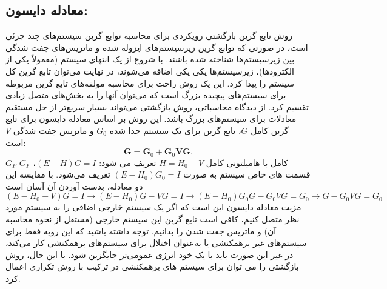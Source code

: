 \subsection{معادله دایسون:}

روش تابع گرین بازگشتی رویکردی برای محاسبه توابع گرین سیستم‌های چند جزئی است، در صورتی که توابع گرین زیرسیستم‌های ایزوله شده و ماتریس‌های جفت شدگی بین زیرسیستم‌ها شناخته شده باشند. با شروع از یک انتهای سیستم (معمولاً یکی از الکترودها)، زیرسیستم‌ها یکی یکی اضافه می‌شوند، در نهایت می‌توان تابع گرین کل سیستم را پیدا کرد. این یک روش راحت برای محاسبه مولفه‌های تابع گرین مربوطه برای سیستم‌های پیچیده بزرگ است که می‌توان آنها را به بخش‌های متصل زیادی تقسیم کرد. از دیدگاه محاسباتی، روش بازگشتی می‌تواند بسیار سریع‌تر از حل مستقیم معادلات برای سیستم‌های بزرگ باشد.
این روش بر اساس معادله دایسون برای تابع گرین کامل $G$، تابع گرین برای یک سیستم جدا شده $G_0$ و ماتریس جفت شدگی $V$ است:
\begin{equation}
    \mathbf{G}={{\mathbf{G}}_{0}}+{{\mathbf{G}}_{0}}\mathbf{VG}.
\end{equation}
$G_F$ کامل با هامیلتونی کامل $H = H_0 + V$ تعریف می شود: $(E - H) G = I$، $G_F$ قسمت های خاص سیستم به صورت $(E - H_0) G_0 = I$ تعریف می‌شود. با مقایسه این دو معادله، بدست آوردن آن آسان است$\left(E-H_0-V\right)G=I\rightarrow\left(E-H_0\right)G-VG=I\rightarrow\left(E-H_0\right)G_0G-G_0VG=G_0\rightarrow G-G_0VG=G_0$
مزیت معادله دایسون این است که اگر یک سیستم خارجی اضافی را به سیستم مورد نظر متصل کنیم، کافی است تابع گرین این سیستم خارجی (مستقل از نحوه محاسبه آن) و ماتریس جفت شدن را بدانیم. توجه داشته باشید که این رویه فقط برای سیستم‌های غیر برهمکنشی یا به‌عنوان اختلال  برای سیستم‌های برهمکنشی کار می‌کند، در غیر این صورت  باید با یک خود انرژی عمومی‌تر جایگزین شود. با این حال، روش بازگشتی را می توان برای سیستم های برهمکنشی در ترکیب با روش تکراری اعمال کرد.

